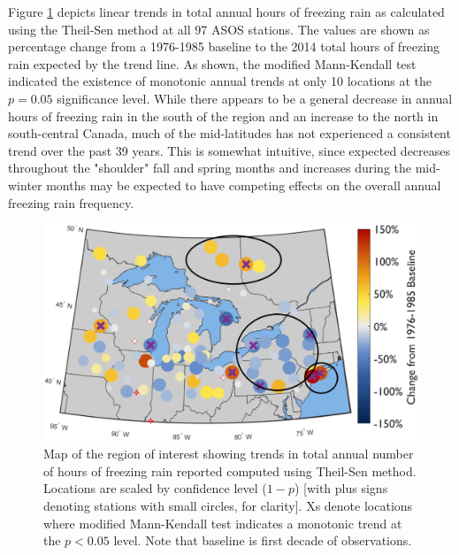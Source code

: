 \documentclass[twocol]{ametsoc}
\begin{document}

Figure \ref{fig:trendmap} depicts linear trends in total annual hours of freezing rain as calculated using the Theil-Sen method at all 97 ASOS stations. The values are shown as percentage change from a 1976-1985 baseline to the 2014 total hours of freezing rain expected by the trend line. As shown, the modified Mann-Kendall test indicated the existence of monotonic annual trends at only 10 locations at the $p=0.05$ significance level. While there appears to be a general decrease in annual hours of freezing rain in the south of the region and an increase to the north in south-central Canada, much of the mid-latitudes has not experienced a consistent trend over the past 39 years. This is somewhat intuitive, since expected decreases throughout the "shoulder" fall and spring months and increases during the mid-winter months may be expected to have competing effects on the overall annual freezing rain frequency.

\begin{figure}
\centering
\includegraphics[width=1.0\textwidth]{trendmap.png}
\caption{\label{fig:trendmap}Map of the region of interest showing trends in total annual number of hours of freezing rain reported computed using Theil-Sen method. Locations are scaled by confidence level ($1 - p$) [with plus signs denoting stations with small circles, for clarity]. Xs denote locations where modified Mann-Kendall test indicates a monotonic trend at the $p<0.05$ level. Note that baseline is first decade of observations.}
\end{figure}
\end{document}
